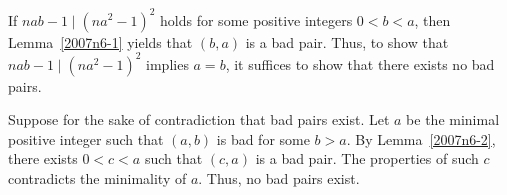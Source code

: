 \documentclass{article}
\begin{document}
If $nab - 1 \mid (na^2 - 1)^2$ holds for some positive integers $0 < b < a$, then Lemma~\ref{2007n6-1} yields that $(b, a)$ is a bad pair.
Thus, to show that $nab - 1 \mid (na^2 - 1)^2$ implies $a = b$, it suffices to show that there exists no bad pairs.

Suppose for the sake of contradiction that bad pairs exist.
Let $a$ be the minimal positive integer such that $(a, b)$ is bad for some $b > a$.
By Lemma~\ref{2007n6-2}, there exists $0 < c < a$ such that $(c, a)$ is a bad pair.
The properties of such $c$ contradicts the minimality of $a$.
Thus, no bad pairs exist.
\end{document}
